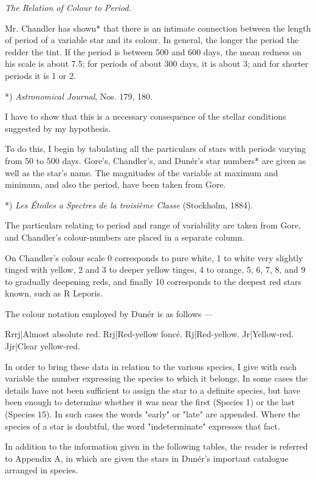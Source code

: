 \documentclass[a4paper, 12pt, oneside, polutonikogreek, english]{article}
\begin{document}
\emph{The Relation of Colour to Period.}

Mr. Chandler has shown* that there is an intimate connection between the length of period of a variable star and its colour. In general, the longer the period the redder the tint. If the period is between 500 and 600 days, the mean redness on his scale is about 7.5; for periods of about 300 days, it is about 3; and for shorter periods it is 1 or 2.

*) \emph{Astronomical Journal}, Nos. 179, 180.

I have to show that this is a necessary consequence of the stellar conditions suggested by my hypothesis.

To do this, I begin by tabulating all the particulars of stars with periods varying from 50 to 500 days. Gore's, Chandler's, and Dunér's star numbers* are given as well as the star's name. The magnitudes of the variable at maximum and minimum, and also the period, have been taken from Gore.

*) \emph{Les Étoiles a Spectres de la troisième Classe} (Stockholm, 1884).

The particulars relating to period and range of variability are taken from Gore, and Chandler's colour-numbers are placed in a separate column.

On Chandler's colour scale 0 corresponds to pure white, 1 to white very slightly tinged with yellow, 2 and 3 to deeper yellow tinges, 4 to orange, 5, 6, 7, 8, and 9 to gradually deepening reds, and finally 10 corresponds to the deepest red stars known, such as R Leporis.

The colour notation employed by Dunér is as follows ---

Rrrj|Almost absolute red. Rrj|Red-yellow foncé. Rj|Red-yellow. Jr|Yellow-red. Jjr|Clear yellow-red.

In order to bring these data in relation to the various species, I give with each variable the number expressing the species to which it belongs. In some cases the details have not been sufficient to assign the star to a definite species, but have been enough to determine whether it was near the first (Species 1) or the last (Species 15). In such cases the words "early" or "late" are appended. Where the species of a star is doubtful, the word "indeterminate" expresses that fact.

In addition to the information given in the following tables, the reader is referred to Appendix A, in which are given the stars in Dunér's important catalogue arranged in species.
\end{document}
